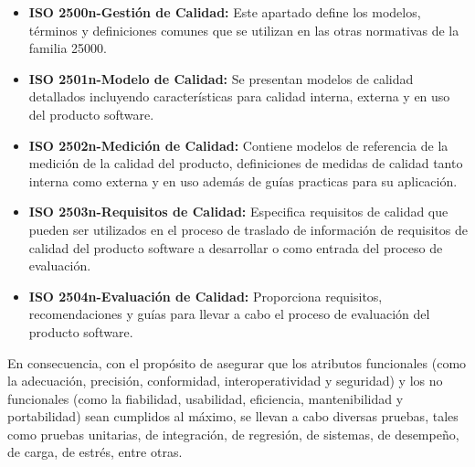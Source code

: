 \begin{itemize}[topsep=0pt]  
    \addtolength\itemsep{-4mm}
    \item \textbf{ISO 2500n-Gestión de Calidad:} Este apartado define los modelos, términos y definiciones comunes que se utilizan en las otras normativas de la familia 25000.
    \item \textbf{ISO 2501n-Modelo de Calidad:} Se presentan modelos de calidad detallados incluyendo características para calidad interna, externa y en uso del producto software.
    \item \textbf{ISO 2502n-Medición de Calidad:}  Contiene modelos de referencia de la medición de la calidad del producto, definiciones de medidas de calidad tanto interna como externa y en uso además
    de guías practicas para su aplicación.
    \item \textbf{ISO 2503n-Requisitos de Calidad:} Especifica requisitos de calidad que pueden ser utilizados en el proceso de traslado de información de requisitos de calidad del producto software a desarrollar o como entrada del proceso de evaluación.
    \item \textbf{ISO 2504n-Evaluación de Calidad:} Proporciona requisitos, recomendaciones y guías para llevar a cabo el proceso de evaluación del producto software.
\end{itemize}

En consecuencia, con el propósito de asegurar que los atributos funcionales (como la adecuación, precisión, conformidad, interoperatividad y seguridad) y los no funcionales (como la fiabilidad, usabilidad, eficiencia, mantenibilidad y portabilidad) sean cumplidos al máximo, se llevan a cabo diversas pruebas, tales como pruebas unitarias, de integración, de regresión, de sistemas, de desempeño, de carga, de estrés, entre otras.
